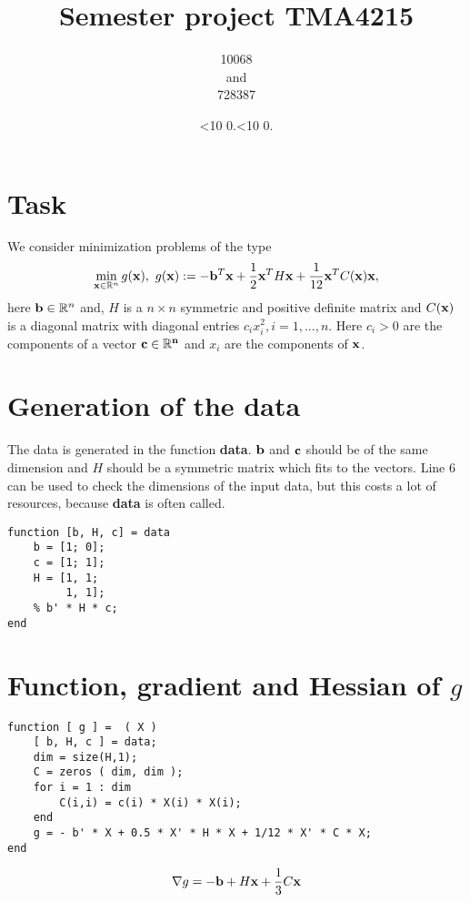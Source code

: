 \documentclass[a4paper,12pt]{article}
\newcommand{\leadingzero}[1]{\ifnum #1<10 0\the#1\else\the#1\fi}
\newcommand{\mytoday}{\leadingzero{\day}.\leadingzero{\month}.\the\year}
\newcommand{\code}[1]{\textbf{#1}}
\begin{document}
\title{Semester project TMA4215}
\author{10068\\ and\\ 728387}
\date{\mytoday}
\maketitle
\newpage


\section{Task}
We consider minimization problems of the type
\begin{align*}
\min_{{\bf x} \in \mathbb{R}^n} g({\bf x}),\,\, g({\bf x}):=-{\bf b}^T{\bf x} + \frac12{\bf x}^TH{\bf x}+\frac1{12}{\bf x}^TC({\bf x}){\bf x},
\end{align*}
here ${\bf b} \in \mathbb{R}^n$ and, $H$ is a $n \times n$ symmetric and positive definite matrix and $C(\bf{x})$ is a diagonal
matrix with diagonal entries $c_i x^2_i, i = 1, . . . , n$. 
Here $c_i > 0$ are the components of a vector $\bf{c} \in \mathbb{R}^n$ 
and $x_i$ are the components of $\bf{x}$. 
\section{Generation of the data}
The data is generated in the function \code{data}.
$\bf{b}$ and $\bf{c}$ should be of the same dimension and $H$ should be a symmetric matrix which fits to the vectors.
Line 6 can be used to check the dimensions of the input data, but this costs a lot of resources, because \code{data} is often called. 
\begin{lstlisting}
function [b, H, c] = data
	b = [1; 0];
	c = [1; 1];
	H = [1, 1;
	     1, 1];
	% b' * H * c;
end
\end{lstlisting}

\section{Function, gradient and Hessian of $g$}

\begin{lstlisting}
function [ g ] =  ( X )
	[ b, H, c ] = data;
	dim = size(H,1);
	C = zeros ( dim, dim );
	for i = 1 : dim
		C(i,i) = c(i) * X(i) * X(i);
	end
	g = - b' * X + 0.5 * X' * H * X + 1/12 * X' * C * X;
end
\end{lstlisting}

\begin{align}\label{grad}
{\bf\nabla} g = -{\bf b} + H{\bf x} + \frac13C{\bf x}
\end{align}
\end{document}
